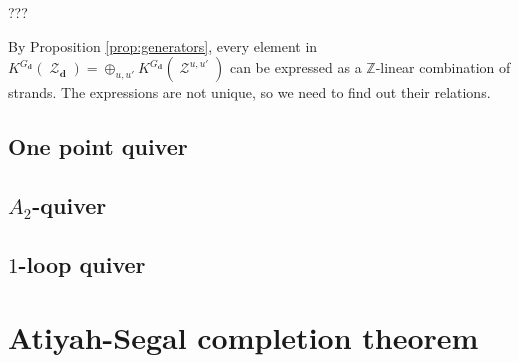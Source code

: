 \documentclass[reqno,11pt]{book}
\numberwithin{equation}{section}
\theoremstyle{plain}
\theoremstyle{plain}
\numberwithin{equation}{section}
\theoremstyle{remark}
\DeclareMathOperator{\St}{\mathcal{Z}}
\newcommand{\dimvec}[1]{\mathbf{#1}}
\begin{document}
???

By Proposition \ref{prop:generators}, every element in $K^{G_{\dimvec{d}}}(\St_{\dimvec{d}})= \oplus_{u,u'} K^{G_{\dimvec{d}}}(\St^{u,u'})$  can be expressed as a $\mathbb{Z}$-linear combination of strands. The expressions are not unique, so we need to find out their relations. 

\subsection{One point quiver}
\subsection{$A_2$-quiver}
\subsection{$1$-loop quiver}


\section{Atiyah-Segal completion theorem}\label{sec:AScompletion}




\end{document}
